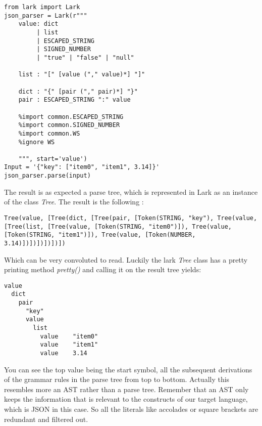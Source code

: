 \documentclass[12pt]{article}
\begin{document}
\begin{lstlisting}
from lark import Lark
json_parser = Lark(r"""
    value: dict
         | list
         | ESCAPED_STRING
         | SIGNED_NUMBER
         | "true" | "false" | "null"

    list : "[" [value ("," value)*] "]"

    dict : "{" [pair ("," pair)*] "}"
    pair : ESCAPED_STRING ":" value

    %import common.ESCAPED_STRING
    %import common.SIGNED_NUMBER
    %import common.WS
    %ignore WS

    """, start='value')
Input = '{"key": ["item0", "item1", 3.14]}'
json_parser.parse(input)
\end{lstlisting}

The result is as expected a parse tree, which is represented in Lark as an instance of the class \emph{Tree}. The result is the following :

\begin{lstlisting}
Tree(value, [Tree(dict, [Tree(pair, [Token(STRING, "key"), Tree(value, [Tree(list, [Tree(value, [Token(STRING, "item0")]), Tree(value, [Token(STRING, "item1")]), Tree(value, [Token(NUMBER, 3.14)])])])])])])
\end{lstlisting}

Which can be very convoluted to read. Luckily the lark \emph{Tree} class has a pretty printing method \emph{pretty()} and calling it on the result tree yields:

\begin{lstlisting}
value
  dict
    pair
      "key"
      value
        list
          value    "item0"
          value    "item1"
          value    3.14

\end{lstlisting}

You can see the top value being the start symbol, all the subsequent derivations of the grammar rules in the parse tree from top to bottom. Actually this resembles more an AST rather than a parse tree. Remember that an AST only keeps the information that is relevant to the constructs of our target language, which is JSON in this case. So all the literals like accolades or square brackets are redundant and filtered out. 
\end{document}
